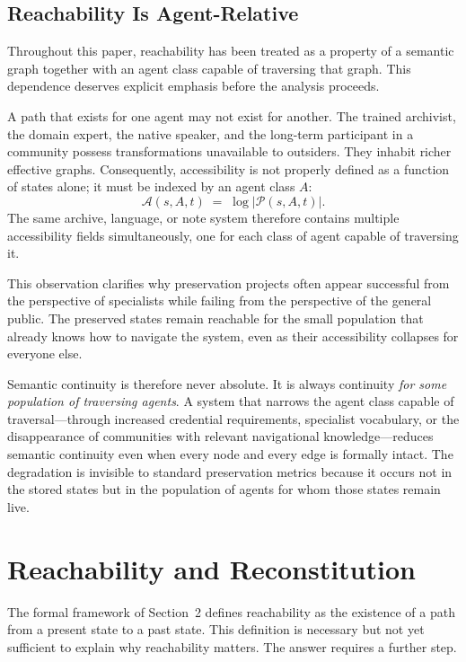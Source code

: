 \documentclass[12pt]{article}
\begin{document}
\subsection{Reachability Is Agent-Relative}

Throughout this paper, reachability has been treated as a property of a
semantic graph together with an agent class capable of traversing that
graph.
This dependence deserves explicit emphasis before the analysis proceeds.

A path that exists for one agent may not exist for another.
The trained archivist, the domain expert, the native speaker, and the
long-term participant in a community possess transformations unavailable
to outsiders.
They inhabit richer effective graphs.
Consequently, accessibility is not properly defined as a function of
states alone; it must be indexed by an agent class $A$:
\[
  \mathcal{A}(s, A, t) \;=\; \log \lvert \mathcal{P}(s, A, t) \rvert.
\]
The same archive, language, or note system therefore contains multiple
accessibility fields simultaneously, one for each class of agent capable
of traversing it.

This observation clarifies why preservation projects often appear
successful from the perspective of specialists while failing from the
perspective of the general public.
The preserved states remain reachable for the small population that already
knows how to navigate the system, even as their accessibility collapses
for everyone else.

Semantic continuity is therefore never absolute.
It is always continuity \emph{for some population of traversing agents}.
A system that narrows the agent class capable of traversal---through
increased credential requirements, specialist vocabulary, or the
disappearance of communities with relevant navigational knowledge---reduces
semantic continuity even when every node and every edge is formally intact.
The degradation is invisible to standard preservation metrics because it
occurs not in the stored states but in the population of agents for whom
those states remain live.

\section{Reachability and Reconstitution}

The formal framework of Section~2 defines reachability as the existence
of a path from a present state to a past state.
This definition is necessary but not yet sufficient to explain why
reachability matters.
The answer requires a further step.
\end{document}
